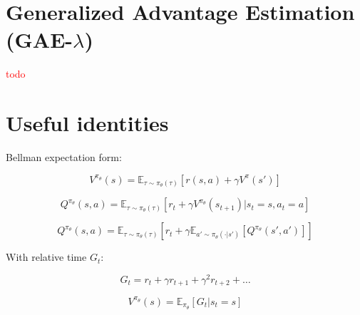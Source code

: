 \documentclass[preprint,12pt]{elsarticle}
\begin{document}
\section{Generalized Advantage Estimation (GAE-$\lambda$) }

\textcolor{red}{todo}


\section*{Useful identities}


Bellman expectation form:


\begin{equation}
\label{eq:bellman-v}
V^{\pi_\theta}(s) = \mathbb{E}_{\tau \sim \pi_\theta(\tau)} [r(s,a) + \gamma V^\pi(s')]
\end{equation}

\begin{equation}
\label{eq:bellman-q-v}
Q^{\pi_\theta}(s,a) = \mathbb{E}_{\tau \sim \pi_\theta(\tau)} [r_t + \gamma V^{\pi_\theta}(s_{t+1}) | s_t=s, a_t=a]
\end{equation}

\begin{equation}
\label{eq:bellman-q-q}
Q^{\pi_\theta}(s,a) = \mathbb{E}_{\tau \sim \pi_\theta(\tau)} [r_t + \gamma \mathbb{E}_{a' \sim \pi_\theta(\cdot|s')} [Q^{\pi_\theta}(s', a')]]
\end{equation}


With relative time $G_t$:

\begin{equation}
\label{eq:relative-return-expanded}
G_t = r_t + \gamma r_{t+1} + \gamma ^2 r_{t+2} + \dots
\end{equation}

\begin{equation}
\label{eq:value-as-expected-return}
V^{\pi_\theta}(s) = \mathbb{E}_{\pi_\theta} \left[ G_t|s_t=s \right]
\end{equation}
\end{document}
